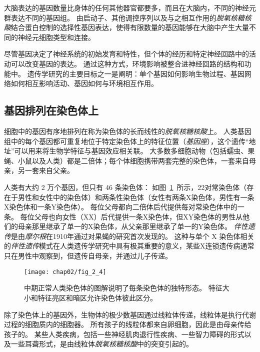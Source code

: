 大脑表达的基因数量比身体的任何其他器官都要多，而且在大脑内，不同的神经元群表达不同的基因组。
由启动子、其他调控序列以及与之相互作用的\textit{脱氧核糖核酸}结合蛋白控制的选择性基因表达，使得有限数量的基因能够在大脑中产生大量不同的神经元细胞类型和连接。



尽管基因决定了神经系统的初始发育和特性，但个体的经历和特定神经回路中的活动可以改变基因的表达。
通过这种方式，环境影响被整合进神经回路的结构和功能中。
遗传学研究的主要目标之一是阐明：单个基因如何影响生物过程、基因网络如何相互影响活动、基因如何与环境相互作用。



\subsection{基因排列在染色体上}

细胞中的基因有序地排列在称为染色体的长而线性的\textit{脱氧核糖核酸}上。
人类基因组中的每个基因都可重复地位于特定染色体上的特征位置（\textit{基因座}），这个遗传“地址”可以用来将生物学特征与基因效应相关联。
大多数多细胞动物（包括蠕虫、果蝇、小鼠以及人类）都是二倍体；每个体细胞携带两套完整的染色体，一套来自母亲，另一套来自父亲。


人类有大约 2 万个基因，但只有 46 条染色体：
如图~\ref{fig:2_4}~所示，22对常染色体（存在于男性和女性中的染色体）和两条性染色体（女性有两条X染色体，男性有一条X染色体和一条Y染色体）。
每位父母都向二倍体后代提供每对常染色体中的一条。
每位父母也向女性（XX）后代提供一条X染色体，但XY染色体的男性从他们的母亲那里继承了单一的X染色体，从父亲那里继承了单一的Y染色体。
\textit{伴性遗传}是由\textit{摩尔根}在1910年通过对果蝇的研究首次发现的。
这种与单个 X 染色体相关的\textit{伴性遗传}模式在人类遗传学研究中具有极其重要的意义，某些X连锁遗传病通常只在男性中观察到，但遗传自母亲，并通过儿子传递。


\begin{figure}[htbp]
	\centering
	\texttt{[image: chap02/fig\_2\_4]}
	\caption{中期正常人类染色体的图解说明了每条染色体的独特形态。
		特征大小和特征亮区和暗区允许染色体彼此区分\cite{watoson1983recombinant}。}
	\label{fig:2_4}
\end{figure}


除了染色体上的基因外，生物体的极少数基因通过线粒体传递，线粒体是执行代谢过程的细胞质内的细胞器。
所有孩子的线粒体都来自卵细胞，因此是由母亲传给孩子的。
某些人类疾病，包括一些神经肌肉退行性疾病、一些智力障碍的形式以及一些耳聋形式，是由线粒体\textit{脱氧核糖核酸}中的突变引起的。


